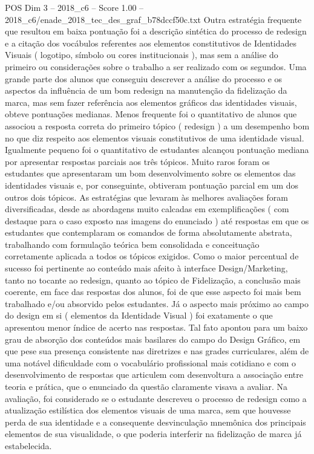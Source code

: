 \begin{textsample}{POS Dim 3 – 2018\_c6 – Score 1.00 – 2018\_c6/enade\_2018\_tec\_des\_graf\_b78dccf50c.txt}
Outra estratégia frequente que resultou em baixa pontuação foi a descrição sintética do processo de redesign e a citação dos vocábulos referentes aos elementos constitutivos de Identidades Visuais ( logotipo, símbolo ou cores institucionais ), mas sem a análise do primeiro ou considerações sobre o trabalho a ser realizado com os segundos.
Uma grande parte dos alunos que conseguiu descrever a análise do processo e os aspectos da influência de um bom redesign na manutenção da fidelização da marca, mas sem fazer referência aos elementos gráficos das identidades visuais, obteve pontuações medianas.
Menos frequente foi o quantitativo de alunos que associou a resposta correta do primeiro tópico ( redesign ) a um desempenho bom no que diz respeito aos elementos visuais constitutivos de uma identidade visual.
Igualmente pequeno foi o quantitativo de estudantes alcançou pontuação mediana por apresentar respostas parciais aos três tópicos.
Muito raros foram os estudantes que apresentaram um bom desenvolvimento sobre os elementos das identidades visuais e, por conseguinte, obtiveram pontuação parcial em um dos outros dois tópicos.
As estratégias que levaram às melhores avaliações foram diversificadas, desde as abordagens muito calcadas em exemplificações ( com destaque para o caso exposto nas imagens do enunciado ) até respostas em que os estudantes que contemplaram os comandos de forma absolutamente abstrata, trabalhando com formulação teórica bem consolidada e conceituação corretamente aplicada a todos os tópicos exigidos.
Como o maior percentual de sucesso foi pertinente ao conteúdo mais afeito à interface Design/Marketing, tanto no tocante ao redesign, quanto ao tópico de Fidelização, a conclusão mais coerente, em face das respostas dos alunos, foi de que esse aspecto foi mais bem trabalhado e/ou absorvido pelos estudantes.
Já o aspecto mais próximo ao campo do design em si ( elementos da Identidade Visual ) foi exatamente o que apresentou menor índice de acerto nas respostas.
Tal fato apontou para um baixo grau de absorção dos conteúdos mais basilares do campo do Design Gráfico, em que pese sua presença consistente nas diretrizes e nas grades curriculares, além de uma notável dificuldade com o vocabulário profissional mais cotidiano e com o desenvolvimento de respostas que articulem com desenvoltura a associação entre teoria e prática, que o enunciado da questão claramente visava a avaliar.
Na avaliação, foi considerado se o estudante descreveu o processo de redesign como a atualização estilística dos elementos visuais de uma marca, sem que houvesse perda de sua identidade e a consequente desvinculação mnemônica dos principais elementos de sua visualidade, o que poderia interferir na fidelização de marca já estabelecida.

\end{textsample}
